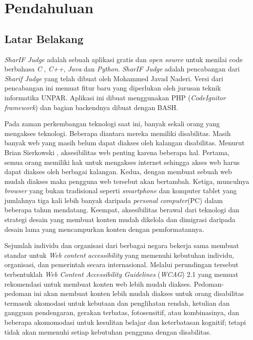 \chapter{Pendahuluan}
\label{chap:intro}
   
\section{Latar Belakang}
\label{sec:label}
\textit{SharIF Judge} \cite{SharIF_Judge} adalah sebuah aplikasi gratis dan \textit{open source} untuk menilai code berbahasa \textit{C} , \textit{C++}, \textit{Java} dan \textit{Python}. \textit{SharIF Judge} adalah pencabangan dari \textit{Sharif Judge} \cite{Sharif_Judge_Original} yang telah dibuat oleh Mohammed Javad Naderi. Versi dari pencabangan ini memuat fitur baru yang diperlukan oleh jurusan teknik informatika UNPAR. Aplikasi ini dibuat menggunakan PHP (\textit{CodeIgnitor framework}) dan bagian backendnya dibuat dengan BASH.

Pada zaman perkembangan teknologi saat ini, banyak sekali orang yang mengakses teknologi. Beberapa diantara mereka memiliki disabilitas. Masih banyak web yang masih belum dapat diakses oleh kalangan disabilitas. Menurut Brian Sierkowski \cite{brian}, aksesibilitas web penting karena beberapa hal. Pertama, semua orang memiliki hak untuk mengakses internet sehingga akses web harus dapat diakses oleh berbagai kalangan. Kedua, dengan membuat sebuah web mudah diakses maka pengguna web tersebut akan bertambah. Ketiga, munculnya \textit{browser} yang bukan tradisional seperti \textit{smartphone} dan komputer tablet yang jumlahnya tiga kali lebih banyak daripada \textit{personal computer}(PC) dalam beberapa tahun mendatang. Keempat, aksesibilitas berawal dari teknologi dan strategi desain yang membuat konten mudah dikelola dan dimigrasi daripada desain lama yang mencampurkan konten dengan pemformatannya.

Sejumlah individu dan organisasi dari berbagai negara bekerja sama membuat standar untuk \textit{Web content accessibility} yang memenuhi kebutuhan individu, organisasi, dan pemerintah secara internasional. Melalui perundingan tersebut terbentuklah \textit{Web Content Accessibility Guidelines} (\textit{WCAG}) 2.1 \cite{WCAG:2.1} yang memuat rekomendasi untuk membuat konten web lebih mudah diakses. Pedoman-pedoman ini akan membuat konten lebih mudah diakses untuk orang disabilitas termasuk akomodasi untuk kebutaan dan penglihatan rendah, ketulian dan gangguan pendengaran, gerakan terbatas, fotosensitif, atau kombinasinya, dan beberapa akomomodasi untuk kesulitan belajar dan keterbatasan kognitif; tetapi tidak akan memenuhi setiap kebutuhan pengguna dengan disabilitas. 

